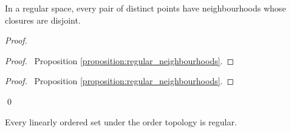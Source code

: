 \begin{proposition}
    In a regular space, every pair of distinct points have neighbourhoods whose
    closures are disjoint.
\end{proposition}

\begin{proof}
    \pf
    \begin{proof}
        \pf\ Proposition \ref{proposition:regular_neighbourhoods}.
    \end{proof}
    \begin{proof}
        \pf\ Proposition \ref{proposition:regular_neighbourhoods}.
    \end{proof}
    \qed
\end{proof}

\begin{proposition}
    Every linearly ordered set under the order topology is regular.
\end{proposition}

